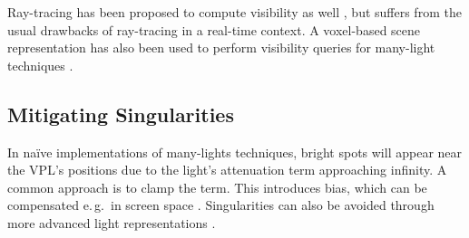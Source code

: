 Ray-tracing has been proposed to compute visibility as well \citep[e.\,g.][]{segovia2006bidirectional}, but suffers from the usual drawbacks of ray-tracing in a real-time context. A voxel-based scene representation has also been used to perform visibility queries for many-light techniques \citep{sun2015manylightsSVO}.


\subsection{Mitigating Singularities}
In naïve implementations of many-lights techniques, bright spots will appear near the VPL’s positions due to the light’s attenuation term approaching infinity. A common approach is to clamp the term. This introduces bias, which can be compensated e.\,g.\ in screen space \citep{novak2011screen}. Singularities can also be avoided through more advanced light representations \citep{tokuyoshi2015vsgl}.


\cleardoublepage
